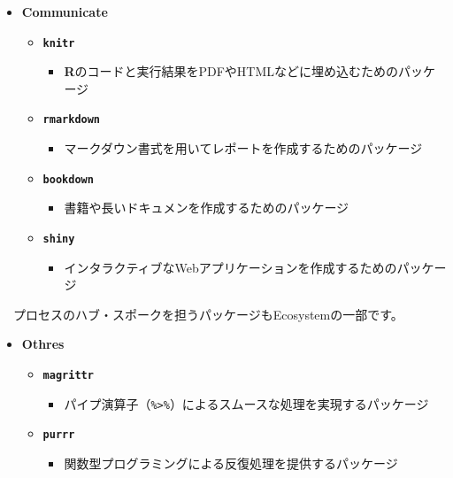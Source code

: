 \documentclass[
  12pt,
]{book}
\providecommand{\tightlist}{%
  \setlength{\itemsep}{0pt}\setlength{\parskip}{0pt}}
\begin{document}
\newpage

\begin{itemize}
\tightlist
\item
  \textbf{Communicate}

  \begin{itemize}
  \tightlist
  \item
    \textbf{\texttt{knitr}} \citep{knitr2014, R-knitr}

    \begin{itemize}
    \tightlist
    \item
      \textbf{R}のコードと実行結果をPDFやHTMLなどに埋め込むためのパッケージ
    \end{itemize}
  \item
    \textbf{\texttt{rmarkdown}} \citep{R-rmarkdown}

    \begin{itemize}
    \tightlist
    \item
      マークダウン書式を用いてレポートを作成するためのパッケージ
    \end{itemize}
  \item
    \textbf{\texttt{bookdown}} \citep{bookdown2016, R-bookdown}

    \begin{itemize}
    \tightlist
    \item
      書籍や長いドキュメンを作成するためのパッケージ
    \end{itemize}
  \item
    \textbf{\texttt{shiny}} \citep{R-shiny}

    \begin{itemize}
    \tightlist
    \item
      インタラクティブなWebアプリケーションを作成するためのパッケージ
    \end{itemize}
  \end{itemize}
\end{itemize}

　プロセスのハブ・スポークを担うパッケージもEcosystemの一部です。

\begin{itemize}
\tightlist
\item
  \textbf{Othres}

  \begin{itemize}
  \tightlist
  \item
    \textbf{\texttt{magrittr}} \citep{R-magrittr}

    \begin{itemize}
    \tightlist
    \item
      パイプ演算子（\texttt{\%\textgreater{}\%}）によるスムースな処理を実現するパッケージ
    \end{itemize}
  \item
    \textbf{\texttt{purrr}} \citep{R-purrr}

    \begin{itemize}
    \tightlist
    \item
      関数型プログラミングによる反復処理を提供するパッケージ
    \end{itemize}
  \end{itemize}
\end{itemize}
\end{document}
